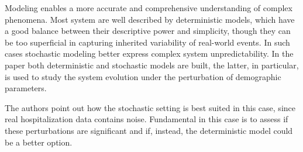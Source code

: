 Modeling enables a more accurate and comprehensive understanding of complex phenomena. Most system are well described by deterministic models, which have a good balance between their descriptive power and simplicity, though they can be too superficial in capturing inherited variability of real-world  events. In such cases stochastic modeling better express complex system unpredictability. In the paper both deterministic and stochastic models are built, the latter, in particular, is used to study the system evolution under the perturbation of demographic parameters. \par
The authors point out how the stochastic setting is best suited in this case, since real hospitalization data contains noise. Fundamental in this case is to assess if these perturbations are significant and if, instead, the deterministic model could be a better option.